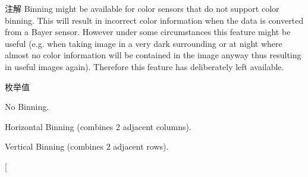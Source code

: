 \begin{DoxyNote}{注解}
Binning might be available for color sensors that do not support color binning. This will result in incorrect color information when the data is converted from a Bayer sensor. However under some circumstances this feature might be useful (e.\+g. when taking image in a very dark surrounding or at night where almost no color information will be contained in the image anyway thus resulting in useful images again). Therefore this feature has deliberately left available. ~\newline
 ~\newline
 
\end{DoxyNote}
\begin{Desc}
\item[枚举值]\par
\begin{description}
\item[{\em 
\hypertarget{group___device_specific_interface_gga915d7e18807e69567ac466541b66313ba4cd8cbdad824509f49e8cc32f44f6abd}{cbm\+Off}\label{group___device_specific_interface_gga915d7e18807e69567ac466541b66313ba4cd8cbdad824509f49e8cc32f44f6abd}
}]No Binning. \item[{\em 
\hypertarget{group___device_specific_interface_gga915d7e18807e69567ac466541b66313baa9ed6a2ad421b2db101bc8b444a2256a}{cbm\+Binning\+H}\label{group___device_specific_interface_gga915d7e18807e69567ac466541b66313baa9ed6a2ad421b2db101bc8b444a2256a}
}]Horizontal Binning (combines 2 adjacent columns). \item[{\em 
\hypertarget{group___device_specific_interface_gga915d7e18807e69567ac466541b66313bac96a80f5ccdc944a0dca259769c28240}{cbm\+Binning\+V}\label{group___device_specific_interface_gga915d7e18807e69567ac466541b66313bac96a80f5ccdc944a0dca259769c28240}
}]Vertical Binning (combines 2 adjacent rows). \item[{\em 
}
\end{description}
\end{Desc}
